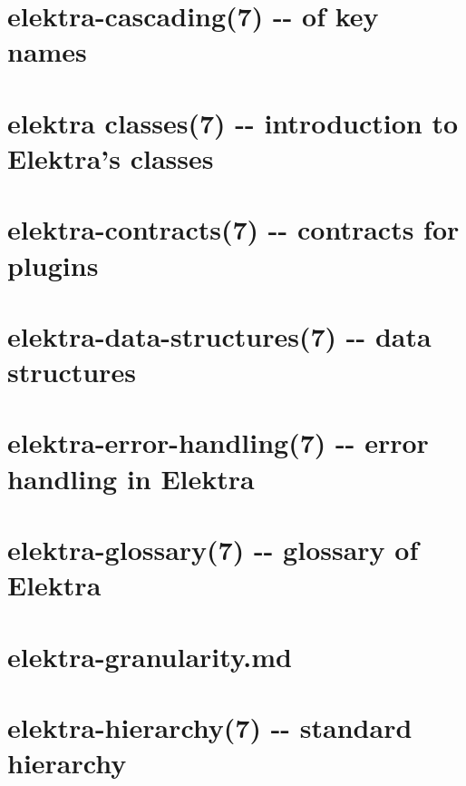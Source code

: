 \documentclass[twoside]{book}
\newcommand{\+}{\discretionary{\mbox{\scriptsize$\hookleftarrow$}}{}{}}
\begin{document}
\chapter{elektra-\/cascading(7) -\/-\/ of key names}
\label{md_doc_help_elektra-cascading}
\hypertarget{md_doc_help_elektra-cascading}{}

\chapter{elektra classes(7) -\/-\/ introduction to Elektra's classes}
\label{md_doc_help_elektra-classes}
\hypertarget{md_doc_help_elektra-classes}{}

\chapter{elektra-\/contracts(7) -\/-\/ contracts for plugins}
\label{md_doc_help_elektra-contracts}
\hypertarget{md_doc_help_elektra-contracts}{}

\chapter{elektra-\/data-\/structures(7) -\/-\/ data structures}
\label{md_doc_help_elektra-data-structures}
\hypertarget{md_doc_help_elektra-data-structures}{}

\chapter{elektra-\/error-\/handling(7) -\/-\/ error handling in Elektra}
\label{md_doc_help_elektra-error-handling}
\hypertarget{md_doc_help_elektra-error-handling}{}

\chapter{elektra-\/glossary(7) -\/-\/ glossary of Elektra}
\label{md_doc_help_elektra-glossary}
\hypertarget{md_doc_help_elektra-glossary}{}

\chapter{elektra-\/granularity.md}
\label{doc_help_elektra-granularity_md}
\hypertarget{doc_help_elektra-granularity_md}{}

\chapter{elektra-\/hierarchy(7) -\/-\/ standard hierarchy}
\label{md_doc_help_elektra-hierarchy}
\hypertarget{md_doc_help_elektra-hierarchy}{}

\end{document}
